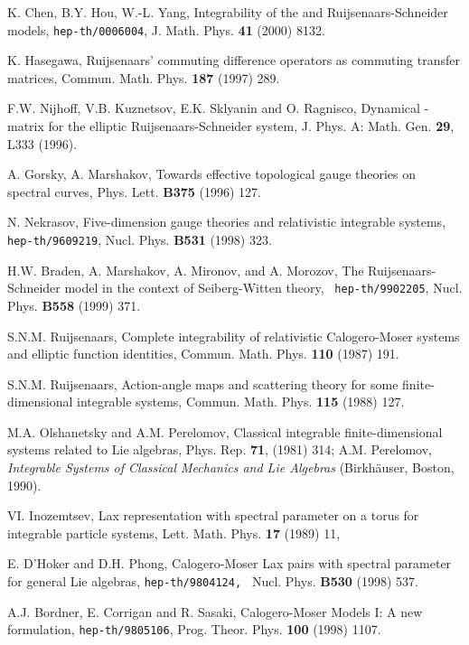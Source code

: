 \documentclass[a4paper,12pt]{article}
\begin{document}
\begin{thebibliography}{99}
	 K. Chen, B.Y. Hou, W.-L. Yang, Integrability of the \coordHE{}
and \coordHE{} Ruijsenaars-Schneider models,
\texttt{hep-th/0006004}, J. Math. Phys. \textbf{41} (2000) 8132.

  K. Hasegawa, Ruijsenaars' commuting difference operators as
commuting transfer matrices, Commun. Math. Phys.
\textbf{187} (1997) 289.

	F.W. Nijhoff, V.B. Kuznetsov, E.K. Sklyanin and O. Ragnisco,
Dynamical \coordHE{}-matrix for the elliptic Ruijsenaars-Schneider
system, J. Phys. A: Math. Gen. \textbf{29}, L333 (1996).

  A. Gorsky, A. Marshakov, Towards effective topological gauge
theories on spectral curves, Phys. Lett. \textbf{B375} (1996) 127.

  N. Nekrasov, Five-dimension gauge theories and relativistic
integrable systems, \texttt{hep-th/9609219}, Nucl. Phys.
\textbf{B531} (1998) 323.

  H.W. Braden, A. Marshakov, A. Mironov, and A. Morozov, The
Ruijsenaars-Schneider model in the context of Seiberg-Witten
theory, \texttt{ hep-th/9902205}, Nucl. Phys. \textbf{B558} (1999) 371.

  S.N.M. Ruijsenaars, Complete integrability of relativistic
Calogero-Moser systems and elliptic function identities,
Commun. Math. Phys. \textbf{110} (1987) 191.


  S.N.M. Ruijsenaars, Action-angle maps and scattering theory
for some finite-dimensional integrable systems, Commun.
Math. Phys. \textbf{ 115} (1988) 127.

  M.A. Olshanetsky and A.M. Perelomov, Classical integrable
finite-dimensional systems related to Lie algebras, Phys.
Rep. \textbf{71}, (1981) 314; A.M. Perelomov,
\textit{Integrable Systems of Classical Mechanics
and Lie Algebras} (Birkh\"{a}user, Boston, 1990).

  VI. Inozemtsev, Lax representation with spectral parameter on
a torus for integrable particle systems, Lett. Math. Phys.
\textbf{17} (1989) 11,

  E. D'Hoker and D.H. Phong, Calogero-Moser Lax pairs with
spectral parameter for general Lie algebras,
\texttt{hep-th/9804124, } Nucl. Phys. \textbf{B530} (1998)
537.

  A.J. Bordner, E. Corrigan and R. Sasaki, Calogero-Moser
Models I: A new formulation, \texttt{hep-th/9805106}, Prog.
Theor. Phys. \textbf{100} (1998) 1107.


\end{thebibliography}
\end{document}
